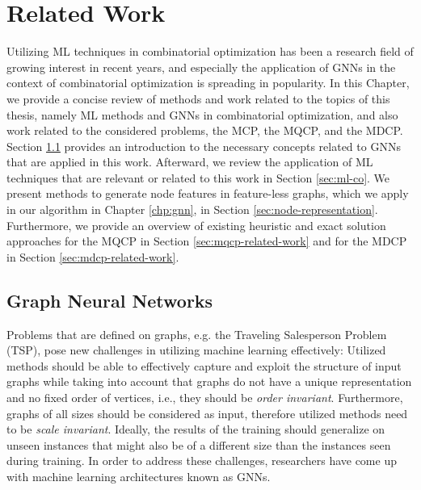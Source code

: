 \documentclass[draft,final]{vutinfth} %
\newtheorem{definition}{Definition}[section]
\begin{document}




\chapter{Related Work}\label{chp:related-work}

Utilizing ML techniques in combinatorial optimization has been a research field of growing interest in recent years, and especially the application of GNNs in the context of combinatorial optimization is spreading in popularity. 
In this Chapter, we provide a concise review of methods and work related to the topics of this thesis, namely ML methods and GNNs in combinatorial optimization, and also work related to the considered problems, the MCP, the MQCP, and the MDCP. Section \ref{sec:gnns} provides an introduction to the necessary concepts related to GNNs that are applied in this work. Afterward, we review the application of ML techniques that are relevant or related to this work in Section \ref{sec:ml-co}. We present methods to generate node features in feature-less graphs, which we apply in our algorithm in Chapter \ref{chp:gnn}, in Section \ref{sec:node-representation}. Furthermore, we provide an overview of existing heuristic and exact solution approaches for the MQCP in Section \ref{sec:mqcp-related-work} and for the MDCP in Section \ref{sec:mdcp-related-work}. 

\section{Graph Neural Networks}\label{sec:gnns}
Problems that are defined on graphs, e.g. the Traveling Salesperson Problem (TSP), pose new challenges in utilizing machine learning effectively: Utilized methods should be able to effectively capture and exploit the structure of input graphs while taking into account that graphs do not have a unique representation and no fixed order of vertices, i.e., they should be \emph{order invariant}. Furthermore, graphs of all sizes should be considered as input, therefore utilized methods need to be \emph{scale invariant}. Ideally, the results of the training should generalize on unseen instances that might also be of a different size than the instances seen during training. In order to address these challenges, researchers have come up with machine learning architectures known as GNNs. 
\end{document}
